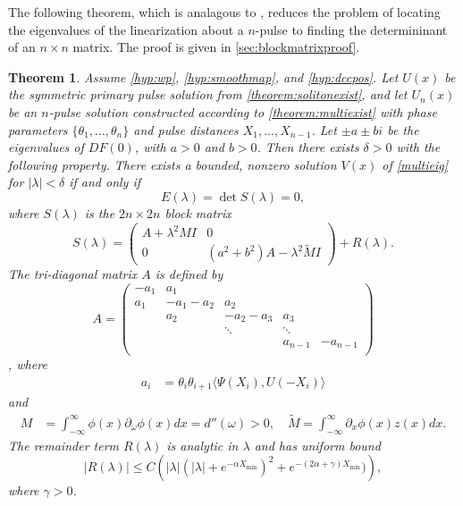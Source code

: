 \documentclass[12pt]{article}
\newtheorem{theorem}{Theorem}
\begin{document}
The following theorem, which is analagous to \cite[Theorem 2]{Sandstede1998}, reduces the problem of locating the eigenvalues of the linearization about a $n$-pulse to finding the determininant of an $n\times n$ matrix. The proof is given in \cref{sec:blockmatrixproof}.

\begin{theorem}\label{th:blockmatrix}
Assume \cref{hyp:wp}, \cref{hyp:smoothmap}, and \cref{hyp:dccpos}. Let $U(x)$ be the symmetric primary pulse solution from \cref{theorem:solitonexist}, and let $U_n(x)$ be an $n$-pulse solution constructed according to \cref{theorem:multiexist} with phase parameters $\{ \theta_1, \dots, \theta_n \}$ and pulse distances $X_1, \dots, X_{n-1}$. Let $\pm a \pm bi$ be the eigenvalues of $DF(0)$, with $a > 0$ and $b > 0$. Then there exists $\delta > 0$ with the following property. There exists a bounded, nonzero solution $V(x)$ of \cref{multieig} for $|\lambda| < \delta$ if and only if
\begin{equation}\label{blockmatrixcond}
E(\lambda) = \det S(\lambda) = 0,
\end{equation}
where $S(\lambda)$ is the $2n \times 2n$ block matrix
\begin{equation}\label{blockeq}
S(\lambda) = 
\begin{pmatrix}
A + \lambda^2 M I & 0 \\
0 & (a^2 + b^2) A - \lambda^2 \tilde{M} I
\end{pmatrix} + R(\lambda).
\end{equation}
The tri-diagonal matrix $A$ is defined by
\begin{equation*}
A = \begin{pmatrix}
-a_1 & a_1 \\
a_1 & -a_1 - a_2 &  a_2 \\
& a_2 & -a_2 - a_3 &  a_3 \\
& & \ddots & \ddots \\
& & &  a_{n-1} & -a_{n-1} \\
\end{pmatrix}
\end{equation*},
where
\begin{align*}
a_i &= \theta_i \theta_{i+1} \langle \Psi(X_i), U(-X_i) \rangle \end{align*}
and
\begin{align*}
M &= \int_{-\infty}^\infty \phi(x) \partial_\omega \phi(x) dx = d''(\omega) > 0, \quad
\tilde{M} = \int_{-\infty}^\infty \partial_x \phi(x) z(x) dx.
\end{align*}
The remainder term $R(\lambda)$ is analytic in $\lambda$ and has uniform bound
\[
|R(\lambda)| \leq C\left( |\lambda|(|\lambda| + e^{-\alpha X_{\min}})^2 + e^{-(2 \alpha + \gamma)X_{\min} }) \right),
\]
where $\gamma > 0$.
\end{theorem}
\end{document}
